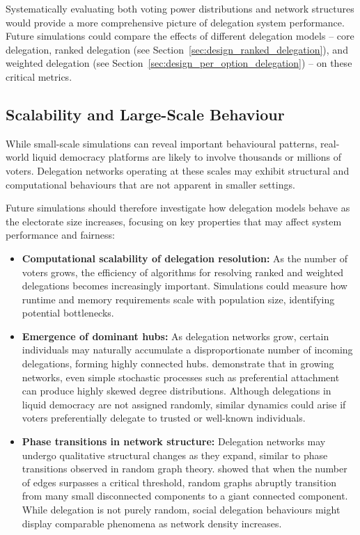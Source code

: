 Systematically evaluating both voting power distributions and network structures would provide a more comprehensive picture of delegation system performance. Future simulations could compare the effects of different delegation models -- core delegation, ranked delegation (see Section~\ref{sec:design_ranked_delegation}), and weighted delegation (see Section~\ref{sec:design_per_option_delegation}) -- on these critical metrics.

\subsection{Scalability and Large-Scale Behaviour}

While small-scale simulations can reveal important behavioural patterns, real-world liquid democracy platforms are likely to involve thousands or millions of voters. Delegation networks operating at these scales may exhibit structural and computational behaviours that are not apparent in smaller settings.

Future simulations should therefore investigate how delegation models behave as the electorate size increases, focusing on key properties that may affect system performance and fairness:

\begin{itemize}
\item \textbf{Computational scalability of delegation resolution:} As the number of voters grows, the efficiency of algorithms for resolving ranked and weighted delegations becomes increasingly important. Simulations could measure how runtime and memory requirements scale with population size, identifying potential bottlenecks.

\item \textbf{Emergence of dominant hubs:} As delegation networks grow, certain individuals may naturally accumulate a disproportionate number of incoming delegations, forming highly connected hubs. \citet{barabasi_albert_1999} demonstrate that in growing networks, even simple stochastic processes such as preferential attachment can produce highly skewed degree distributions. Although delegations in liquid democracy are not assigned randomly, similar dynamics could arise if voters preferentially delegate to trusted or well-known individuals.

\item \textbf{Phase transitions in network structure:} Delegation networks may undergo qualitative structural changes as they expand, similar to phase transitions observed in random graph theory. \citet{erdos_renyi_1959} showed that when the number of edges surpasses a critical threshold, random graphs abruptly transition from many small disconnected components to a giant connected component. While delegation is not purely random, social delegation behaviours might display comparable phenomena as network density increases.

\end{itemize}

